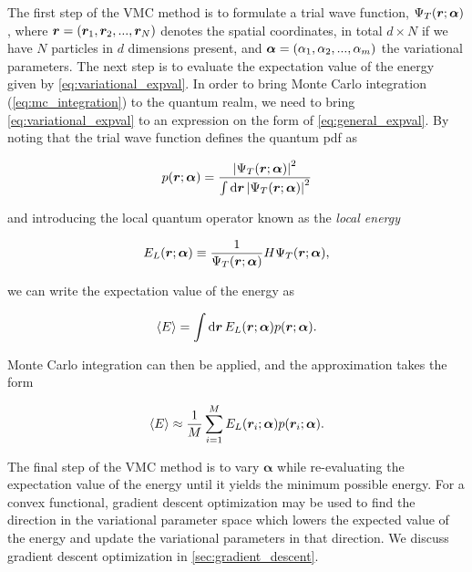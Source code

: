 The first step of the VMC method is to formulate a trial wave function, $\Psi_T \qty(\bm{r}; \bm{\alpha})$, where $\bm{r} = \qty(\bm{r}_1, \bm{r}_2, ..., \bm{r}_N)$ denotes the spatial coordinates, in total $d\times N$ if we have $N$ particles in $d$ dimensions present, and $\bm{\alpha} = \qty(\alpha_1, \alpha_2, ..., \alpha_m)$ the variational parameters. The next step is to evaluate the expectation value of the energy given by \autoref{eq:variational_expval}. In order to bring Monte Carlo integration (\autoref{eq:mc_integration}) to the quantum realm, we need to bring \autoref{eq:variational_expval} to an expression on the form of \autoref{eq:general_expval}. By noting that the trial wave function defines the quantum pdf as 

\begin{equation}\label{eq:wf_pdf}
    p \qty(\bm{r}; \bm{\alpha}) = \frac{\abs{\Psi_T \qty(\bm{r}; \bm{\alpha})}^2}{\int \dd{\bm{r}} \abs{\Psi_T \qty(\bm{r}; \bm{\alpha})}^2}
\end{equation}

and introducing the local quantum operator known as the \textit{local energy}

\begin{equation}\label{eq:variational_local_energy}
    E_L \qty(\bm{r}; \bm{\alpha}) \equiv \frac{1}{\Psi_T \qty(\bm{r}; \bm{\alpha})} H \Psi_T \qty(\bm{r}; \bm{\alpha}),
\end{equation}

we can write the expectation value of the energy as 

\begin{equation}
    \expval{E} = \int \dd{\bm{r}} E_L \qty(\bm{r}; \bm{\alpha}) p \qty(\bm{r}; \bm{\alpha}).
\end{equation}

Monte Carlo integration can then be applied, and the approximation takes the form

\begin{equation}
    \expval{E} \approx \frac{1}{M} \sum_{i=1}^M E_L \qty(\bm{r}_i; \bm{\alpha}) p \qty(\bm{r}_i; \bm{\alpha}).
\end{equation}


The final step of the VMC method is to vary $\bm{\alpha}$ while re-evaluating the expectation value of the energy until it yields the minimum possible energy. For a convex functional, gradient descent optimization may be used to find the direction in the variational parameter space which lowers the expected value of the energy and update the variational parameters in that direction. We discuss gradient descent optimization in \autoref{sec:gradient_descent}.

